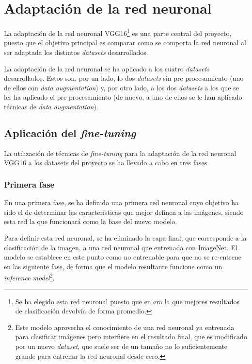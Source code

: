 \section{Adaptación de la red neuronal}

La adaptación de la red neuronal VGG16\footnote{Se ha elegido esta red neuronal puesto que en \cite{tfg_iris_2020} era la que mejores resultados de clasificación devolvía de forma promedio.} es una parte central del proyecto, puesto que el objetivo principal es comparar como se comporta la red neuronal al ser adaptada los distintos \textit{datasets} desarrollados.

La adaptación de la red neuronal se ha aplicado a los cuatro \textit{datasets} desarrollados. Estos son, por un lado, lo dos \textit{datasets} sin pre-procesamiento (uno de ellos con \textit{data augmentation}) y, por otro lado, a los dos \textit{datasets} a los que se les ha aplicado el pre-procesamiento (de nuevo, a uno de ellos se le han aplicado técnicas de \textit{data augmentation}). 
\subsection{Aplicación del \textit{fine-tuning}}

La utilización de técnicas de \textit{fine-tuning} para la adaptación de la red neuronal VGG16 a los datasets del proyecto se ha llevado a cabo en tres fases. 

\subsubsection{Primera fase}
En una primera fase, se ha definido una primera red neuronal cuyo objetivo ha sido el de determinar las características que mejor definen a las imágenes, siendo esta red la que funcionará como la base del nuevo modelo. 

Para definir esta red neuronal, se ha eliminado la capa final, que corresponde a la clasificación de la imagen, a una red neuronal que entrenada con ImageNet. El modelo se establece en este punto como no entrenable para que no se re-entrene en las siguiente fase, de forma que el modelo resultante funcione como un \textit{inference model}\footnote{Este modelo aprovecha el conocimiento de una red neuronal ya entrenada para clasificar imágenes pero interfiere en el resultado final, que es modificado por un nuevo \textit{dataset}, que suele ser de un tamaño no lo suficientemente grande para entrenar la red neuronal desde cero.}. 

